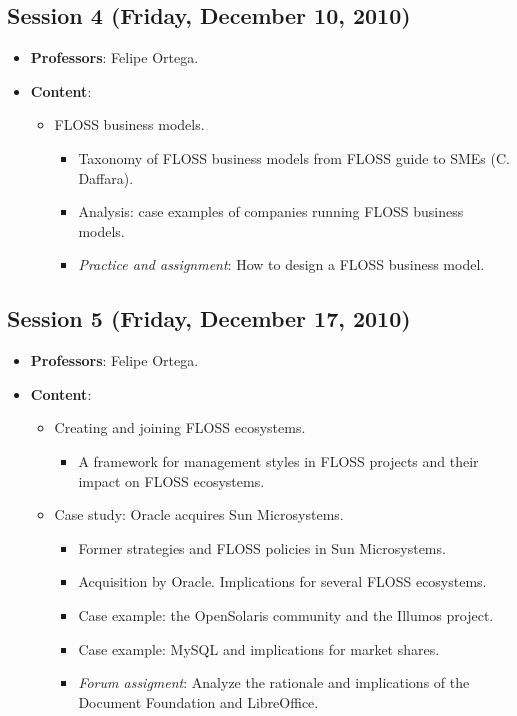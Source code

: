 \documentclass[a4paper]{article}
\begin{document}
\subsection{Session 4 (Friday, December 10, 2010)}

\begin{itemize}
 \item \textbf{Professors}: Felipe Ortega.

 \item \textbf{Content}:

    \begin{itemize}
     \item FLOSS business models.
      \begin{itemize}
       \item Taxonomy of FLOSS business models from FLOSS guide to SMEs (C. Daffara).
       \item Analysis: case examples of companies running FLOSS business models.
       \item \textit{Practice and assignment}: How to design a FLOSS business model.
      \end{itemize}

  \end{itemize}
\end{itemize}

\subsection{Session 5 (Friday, December 17, 2010)}

\begin{itemize}
 \item \textbf{Professors}: Felipe Ortega.

 \item \textbf{Content}:

    \begin{itemize}
     \item Creating and joining FLOSS ecosystems.
	\begin{itemize}
	 \item A framework for management styles in FLOSS projects and their impact on FLOSS ecosystems.
	\end{itemize}

     \item Case study: Oracle acquires Sun Microsystems.
	\begin{itemize}
	 \item Former strategies and FLOSS policies in Sun Microsystems.
	 \item Acquisition by Oracle. Implications for several FLOSS ecosystems.
	 \item Case example: the OpenSolaris community and the Illumos project.
	 \item Case example: MySQL and implications for market shares.
	 \item \textit{Forum assigment}: Analyze the rationale and implications of the Document Foundation and LibreOffice.
	\end{itemize}

    \end{itemize}

\end{itemize}
\end{document}

